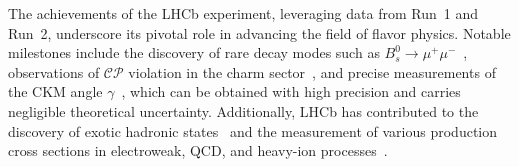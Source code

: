 The achievements of the LHCb experiment, leveraging data from Run~1 and Run~2, underscore its pivotal role in advancing the field of flavor physics. Notable milestones include the discovery of rare decay modes such as $B^0_s\rightarrow\mu^+\mu^-$~\cite{PhysRevLett.111.101805}, observations of $\mathcal{CP}$ violation in the charm sector~\cite{Maccolini:2022y6}, and precise measurements of the CKM angle $\gamma$~\cite{Aaij_2016}, which can be obtained with high precision and carries negligible theoretical uncertainty. Additionally, LHCb has contributed to the discovery of exotic hadronic states~\cite{FANG202266, PhysRevLett.115.072001} and the measurement of various production cross sections in electroweak, QCD, and heavy-ion processes~\cite{ZBoson, Raab:2815873, Duan:2826531}.






